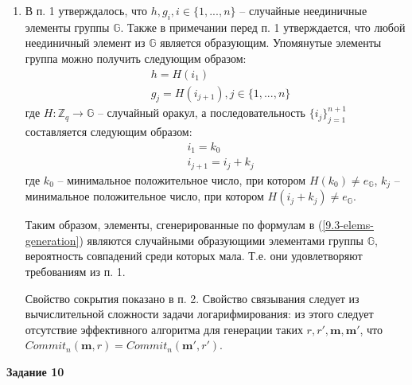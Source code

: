 \documentclass[12pt, a4paper]{extarticle}
\newenvironment*{dummyenv}{}{}
\newcommand{\mysection}[1]{
    \addcontentsline{toc}{section}{#1}
    \begin{dummyenv}
        \bfseries\large #1
    \end{dummyenv}
}
\begin{document}
\begin{enumerate}
    \item В п. 1 утверждалось, что $h, g_i, i \in \{1, ...,n\}$ -- случайные неединичные элементы группы $\mathbb{G}$. Также в примечании перед п. 1 утверждается, что любой неединичный 
    	элемент из $\mathbb{G}$ является образующим. Упомянутые элементы группа можно получить 
    	следующим образом:
        \begin{equation}
            \begin{split}
                & h = H(i_1) \\
                & g_j = H(i_{j + 1}), j \in \{1, ..., n\}
            \end{split}
            \label{9.3-elems-generation}
        \end{equation}
        где $H:\mathbb{Z}_q \to \mathbb{G}$ -- случайный оракул, а последовательность 
        $\{i_j\}_{j=1}^{n+1}$ составляется следующим образом:
        \begin{equation*}
            \begin{split}
                & i_1 = k_0 \\
                & i_{j+1} = i_j + k_j
            \end{split}
        \end{equation*}
        где $k_0$ -- минимальное положительное число, при котором $H(k_0) \ne e_{\mathbb{G}}$, 
        $k_j$ -- минимальное положительное число, при котором $H(i_j + k_j) \ne e_{\mathbb{G}}$.
        
        Таким образом, элементы, сгенерированные по формулам в (\ref{9.3-elems-generation}) являются 
        случайными образующими элементами группы $\mathbb{G}$, вероятность совпадений среди которых 
        мала. Т.е. они удовлетворяют требованиям из п. 1.
        
        Свойство сокрытия показано в п. 2. Свойство связывания следует из вычислительной сложности 
        задачи логарифмирования: из этого следует отсутствие эффективного алгоритма для генерации 
        таких $r, r', \mathbf{m}, \mathbf{m'}$, что $Commit_n(\mathbf{m}, r) = 
        Commit_n(\mathbf{m'}, r')$.
\end{enumerate}

\mysection{Задание 10}
\end{document}
